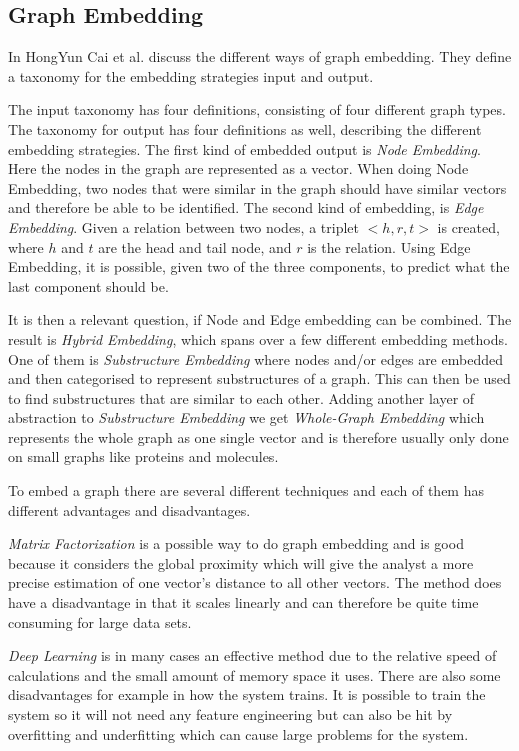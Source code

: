 \subsection{Graph Embedding}
\label{Graph_embedding}
In \cite{8294302} HongYun Cai et al. discuss the different ways of graph embedding. They define a taxonomy for the embedding strategies input and output.

The input taxonomy has four definitions, consisting of four different graph types. The taxonomy for output has four definitions as well, describing the different embedding strategies. The first kind of embedded output is \textit{Node Embedding}. Here the nodes in the graph are represented as a vector. When doing Node Embedding, two nodes that were similar in the graph should have similar vectors and therefore be able to be identified\cite{8294302}. The second kind of embedding, is \textit{Edge Embedding}. Given a relation between two nodes, a triplet $<h,r,t>$ is created,  where $h$ and $t$ are the head and tail node, and $r$ is the relation. Using Edge Embedding, it is possible, given two of the three components, to predict what the last component should be\cite{8294302}.


It is then a relevant question, if Node and Edge embedding can be combined. The result is \textit{Hybrid Embedding}, which spans over a few different embedding methods. One of them is \textit{Substructure Embedding} where nodes and/or edges are embedded and then categorised to represent substructures of a graph. This can then be used to find substructures that are similar to each other\cite{8294302}.
Adding another layer of abstraction to \textit{Substructure Embedding} we get \textit{Whole-Graph Embedding} which represents the whole graph as one single vector and is therefore usually only done on small graphs like proteins and molecules\cite{8294302}.

To embed a graph there are several different techniques and each of them has different advantages and disadvantages.

\textit{Matrix Factorization} is a possible way to do graph embedding and is good because it considers the global proximity which will give the analyst a more precise estimation of one vector's distance to all other vectors. The method does have a disadvantage in that it scales linearly and can therefore be quite time consuming for large data sets\cite{8294302}.

\textit{Deep Learning} is in many cases an effective method due to the relative speed of calculations and the small amount of memory space it uses. There are also some disadvantages for example in how the system trains. It is possible to train the system so it will not need any feature engineering but can also be hit by overfitting and underfitting which can cause large problems for the system\cite{8294302}.

